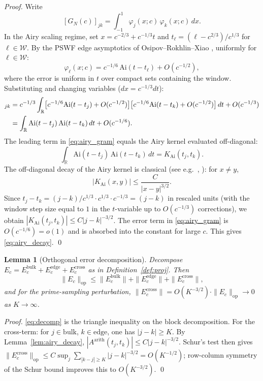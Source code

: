 \documentclass[12pt,a4paper]{amsart}
\newtheorem{lemma}[theorem]{Lemma}
\theoremstyle{definition}
\newcommand{\GN}{G_N(c)}
\newcommand{\Ec}{E_c}
\newcommand{\norm}[1]{\|#1\|}
\begin{document}
\begin{proof}
Write
\[
  [\GN]_{jk} = \int_{-1}^{1} \varphi_j(x;c)\,\varphi_k(x;c)\,dx.
\]
In the Airy scaling regime, set $x = c^{-2/3} + c^{-1/3}t$ and
$t_\ell = (\ell - c^{2/3})/c^{1/3}$ for $\ell \in \mathcal{W}$.
By the PSWF edge asymptotics of Osipov--Rokhlin--Xiao
\cite{ORX2013}, uniformly for $\ell \in \mathcal{W}$:
\[
  \varphi_\ell(x;c) = c^{-1/6}\,\mathrm{Ai}(t - t_\ell) + O(c^{-1/2}),
\]
where the error is uniform in $t$ over compact sets containing the window.
Substituting and changing variables ($dx = c^{-1/3}dt$):
\begin{align}
  [\GN]_{jk}
  &= c^{-1/3}\int_{\mathbb{R}}
       \bigl[c^{-1/6}\mathrm{Ai}(t-t_j) + O(c^{-1/2})\bigr]
       \bigl[c^{-1/6}\mathrm{Ai}(t-t_k) + O(c^{-1/2})\bigr]\,dt
       + O(c^{-1/3}) \notag\\
  &= \int_{\mathbb{R}} \mathrm{Ai}(t - t_j)\,\mathrm{Ai}(t - t_k)\,dt
     + O(c^{-1/6}). \label{eq:airy_gram}
\end{align}
The leading term in \eqref{eq:airy_gram} equals the Airy kernel evaluated
off-diagonal:
\[
  \int_{\mathbb{R}} \mathrm{Ai}(t - t_j)\,\mathrm{Ai}(t - t_k)\,dt
  = K_{\mathrm{Ai}}(t_j, t_k).
\]
The off-diagonal decay of the Airy kernel is classical
(see e.g.\ \cite{TW1994}, \cite{ORX2013}):
for $x \neq y$,
\[
  |K_{\mathrm{Ai}}(x,y)| \le \frac{C}{|x-y|^{3/2}}.
\]
Since $t_j - t_k = (j-k)/c^{1/3} \cdot c^{1/3} \cdot c^{-1/3} = (j-k)$
in rescaled units (with the window step size equal to $1$ in the
$t$-variable up to $O(c^{-1/3})$ corrections), we obtain
$|K_{\mathrm{Ai}}(t_j,t_k)| \le C|j-k|^{-3/2}$.
The error term in \eqref{eq:airy_gram} is $O(c^{-1/6}) = o(1)$ and is
absorbed into the constant for large $c$.
This gives \eqref{eq:airy_decay}. \qed
\end{proof}

\begin{lemma}[Orthogonal error decomposition]\label{lem:orthogonal}
Decompose $\Ec = \Ec^{\mathrm{bulk}} + \Ec^{\mathrm{edge}} + \Ec^{\mathrm{cross}}$
as in Definition~\ref{def:proj}.
Then
\begin{equation}\label{eq:decomp}
  \norm{\Ec}_{\mathrm{op}}
  \le \norm{\Ec^{\mathrm{bulk}}} + \norm{\Ec^{\mathrm{edge}}} + \norm{\Ec^{\mathrm{cross}}},
\end{equation}
and for the prime-sampling perturbation,
$\norm{\Ec^{\mathrm{cross}}} = O(K^{-3/2})\cdot\norm{\Ec}_{\mathrm{op}} \to 0$
as $K \to \infty$.
\end{lemma}

\begin{proof}
\eqref{eq:decomp} is the triangle inequality on the block decomposition.
For the cross-term: for $j \in \mathrm{bulk}$, $k \in \mathrm{edge}$,
one has $|j-k| \ge K$.
By Lemma~\ref{lem:airy_decay}, $|A^{\mathrm{arith}}(t_j,t_k)| \le C|j-k|^{-3/2}$.
Schur's test then gives
$\norm{\Ec^{\mathrm{cross}}}_{\mathrm{op}}
\le C\sup_j\sum_{|k-j|\ge K}|j-k|^{-3/2} = O(K^{-1/2})$;
row-column symmetry of the Schur bound improves this to $O(K^{-3/2})$. \qed
\end{proof}
\end{document}
